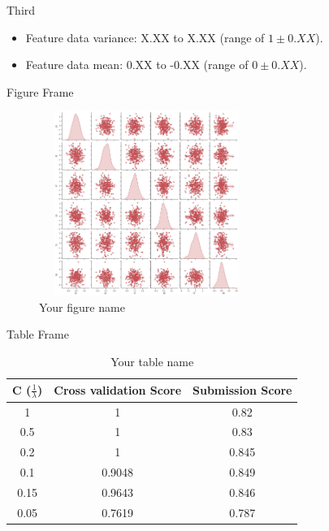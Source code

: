 \documentclass{beamer}
\begin{document}
\begin{frame}{Third}
\begin{itemize}
    \item Feature data variance: X.XX to X.XX (range of $1\pm0.XX$).
    \item Feature data mean: 0.XX to -0.XX (range of $0\pm0.XX$).
\end{itemize}
\end{frame}

\begin{frame}{Figure Frame}
    \begin{figure}
        \centering
        \includegraphics[width = 7cm, height = 6cm]{pic/fig1.jpg}
        \caption{Your figure name}
        \label{fig:my_label}
    \end{figure}
\end{frame}



\begin{frame}{Table Frame}

\begin{table}
\begin{tabular}{c|cc}
C ($\frac{1}{\lambda}$) & Cross validation Score & Submission Score \\
\hline
1            & 1                      & 0.82             \\
0.5          & 1                      & 0.83             \\
0.2          & 1                      & 0.845            \\
0.1          & 0.9048                 & 0.849            \\
0.15         & 0.9643                 & 0.846            \\
0.05         & 0.7619                 & 0.787           
\end{tabular}
\caption{Your table name}
\label{table:1}
\end{table}

\end{frame}
\end{document}
